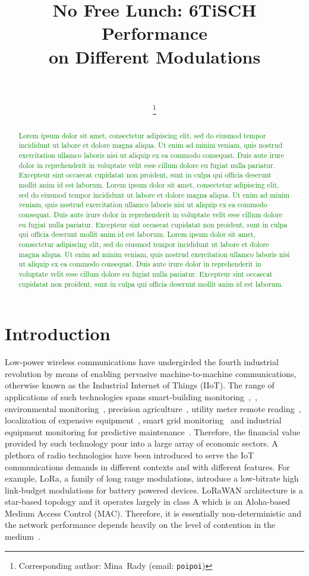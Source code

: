 \documentclass[journal]{IEEEtran}
\newcommand{\lorem}        {\textcolor{green}{Lorem ipsum dolor sit amet, consectetur adipiscing elit, sed do eiusmod tempor incididunt ut labore et dolore magna aliqua. Ut enim ad minim veniam, quis nostrud exercitation ullamco laboris nisi ut aliquip ex ea commodo consequat. Duis aute irure dolor in reprehenderit in voluptate velit esse cillum dolore eu fugiat nulla pariatur. Excepteur sint occaecat cupidatat non proident, sunt in culpa qui officia deserunt mollit anim id est laborum.}}
\begin{document}
\title{No Free Lunch: 6TiSCH Performance\\on Different Modulations}

\author{
    \\
    \\
    \thanks{Corresponding author: Mina~Rady (email: {\tt poipoi})}
}

\maketitle

\begin{abstract}
   \lorem
   \lorem
   \lorem
\end{abstract}

\section{Introduction}
\label{sec:introduction}


Low-power wireless communications have undergirded the fourth industrial revolution by means of enabling pervasive machine-to-machine communications, otherwise known as the Industrial Internet of Things (IIoT).
The range of applications of such technologies spans smart-building monitoring~\cite{munoz18overview},~\cite{kazmi14review}, environmental monitoring~\cite{munoz18evaluationa}, precision agriculture~\cite{watteyne16peacha}, utility meter remote reading~\cite{sum17experimental}, localization of expensive equipment~\cite{tanakademo}, smart grid monitoring~\cite{fadel15survey} and industrial equipment monitoring for predictive maintenance~\cite{civerchia17industrial}.
Therefore, the financial value provided by such technology pour into a large array of economic sectors.
A plethora of radio technologies have been introduced to serve the IoT communications demands in different contexts and with different features.
For example, LoRa, a family of long range modulations, introduce a low-bitrate high link-budget modulations for battery powered devices.
LoRaWAN architecture is a star-based topology and it operates largely in class A which is an Aloha-based Medium Access Control (MAC).
Therefore, it is essentially non-deterministic and the network performance depends heavily on the level of contention in the medium~\cite{adelantado17understanding}.
\end{document}
